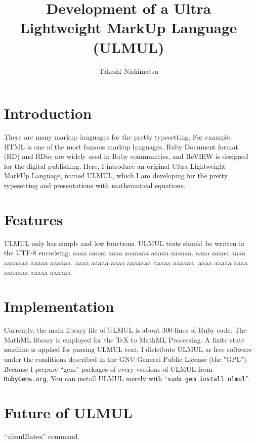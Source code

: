 \documentclass{ajt}            %
\title[You can write TeX style equations.]{Development of a Ultra Lightweight MarkUp Language (ULMUL)}
\author{Takeshi Nishimatsu}
\begin{document}
\maketitle

\section{Introduction}
There are many markup languages for the pretty typesetting.
For example,
HTML is one of the most famous markup languages,
Ruby Document format (RD)\cite{RDtool} and
RDoc\cite{RDoc} are widely used in Ruby communities, and
ReVIEW is designed for the digital publishing\cite{ReVIEW}.
Here, I introduce an original Ultra Lightweight MarkUp Language, named ULMUL,
which I am developing for the pretty typesetting and presentations
with mathematical equations.

\section{Features}
ULMUL only has simple and low functions.
ULMUL texts should be written in the UTF-8 encodeing.
aaaa aaaaa aaaa aaaaaaa aaaaa aaaaaa\cite{Slidy}.
aaaa aaaaa aaaa aaaaaaa aaaaa aaaaaa\cite{ulmul-rubygems}.
aaaa aaaaa aaaa aaaaaaa aaaaa aaaaaa.
aaaa aaaaa aaaa aaaaaaa aaaaa aaaaaa.



\section{Implementation}
Currently, the main library file of ULMUL is about 300 lines of Ruby code.
The MathML library\cite{ruby-mathml} is employed for the TeX to MathML Processing.
A finite state machine is applied for parsing ULMUL text.
I distribute ULMUL as free software under the conditions described in
the GNU General Public License (the "GPL").
Because I prepare ``gem'' packages of every versions of ULMUL from {\tt RubyGems.org},
You can install ULMUL merely with ``{\tt sudo gem install ulmul}''.

\section{Future of ULMUL}
``ulmul2latex'' command.


\end{document}
